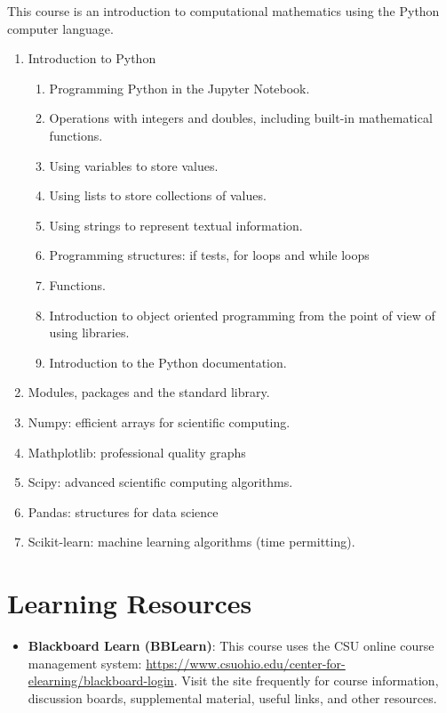 \documentclass[12pt]{article}
\begin{document}
\bigskip
This course is an introduction to computational mathematics using the Python computer language.
\begin{enumerate}
\item Introduction to Python
\begin{enumerate}
\item Programming Python in the Jupyter Notebook.
\item Operations with integers and doubles, including built-in mathematical functions.
\item Using variables to store values.
\item Using lists to store collections of values.
\item Using strings to represent textual information.
\item Programming structures: if tests, for loops and while loops
\item Functions.
\item Introduction to object oriented programming from the point of view of using libraries. 
\item Introduction to the Python documentation.
\end{enumerate}
\item Modules, packages and the standard library.
\item Numpy: efficient arrays for scientific computing.
\item Mathplotlib: professional quality graphs
\item Scipy: advanced scientific computing algorithms.
\item Pandas: structures for data science
\item Scikit-learn: machine learning algorithms (time permitting).

\end{enumerate}

\section{Learning Resources}
\begin{itemize}
\item \textbf{Blackboard Learn (BBLearn)}: This course uses the CSU online course 
management system: 
\href{https://www.csuohio.edu/center-for-elearning/blackboard-login}{https://www.csuohio.edu/center-for-elearning/blackboard-login}. 
Visit the site frequently for course information, discussion boards, supplemental material, useful 
links, and other resources.
\end{itemize}
\end{document}
